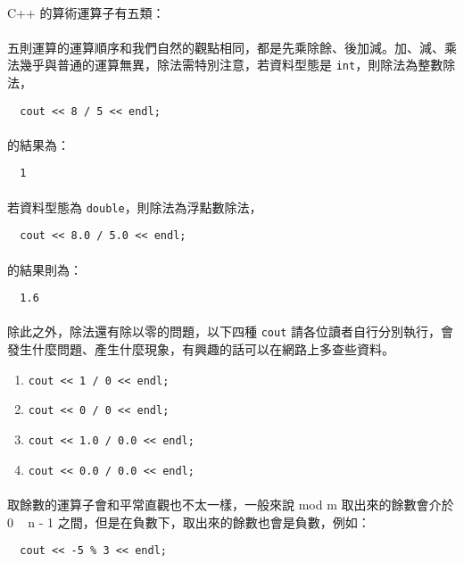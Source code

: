 \documentclass[12pt,a4paper,oneside]{report}
\begin{document}
\begin{CJK}{UTF8}{bkai}
\paragraph{}C++ 的算術運算子有五類：
\paragraph{}五則運算的運算順序和我們自然的觀點相同，都是先乘除餘、後加減。加、減、乘法幾乎與普通的運算無異，除法需特別注意，若資料型態是 \lstinline{int}，則除法為整數除法，
\begin{lstlisting}
  cout << 8 / 5 << endl;
\end{lstlisting}
\paragraph{}的結果為：
\begin{lstlisting}
  1
\end{lstlisting}
\paragraph{}若資料型態為 \lstinline{double}，則除法為浮點數除法，
\begin{lstlisting}
  cout << 8.0 / 5.0 << endl;
\end{lstlisting}
\paragraph{}的結果則為：
\begin{lstlisting}
  1.6
\end{lstlisting}
\paragraph{}除此之外，除法還有除以零的問題，以下四種 \lstinline{cout} 請各位讀者自行分別執行，會發生什麼問題、產生什麼現象，有興趣的話可以在網路上多查些資料。
\begin{enumerate}
\item \lstinline{cout << 1 / 0 << endl;}
\item \lstinline{cout << 0 / 0 << endl;}
\item \lstinline{cout << 1.0 / 0.0 << endl;}
\item \lstinline{cout << 0.0 / 0.0 << endl;}
\end{enumerate}
\paragraph{}取餘數的運算子會和平常直觀也不太一樣，一般來說 mod m 取出來的餘數會介於 0 ~ n - 1 之間，但是在負數下，取出來的餘數也會是負數，例如：
\begin{lstlisting}
  cout << -5 % 3 << endl;
\end{lstlisting}

\end{CJK}
\end{document}
